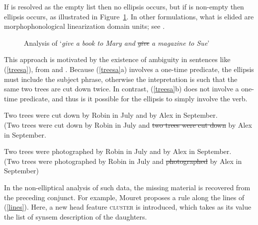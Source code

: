 \documentclass[output=paper]{langsci/langscibook}
\begin{document}
\noindent
If  is resolved as the empty list then no ellipsis occurs, but if  is non-empty then ellipsis occurs, as illustrated in Figure~\ref{lpe}. In other formulations, what is elided are morphophonological
linearization domain units; see \citet{chaveslp}.

\begin{figure}[ht]
    \centering
    

    \caption{Analysis of `\emph{give a book to Mary and} \sout{\emph{give}} \emph{a magazine to Sue}'}\label{lpe}
\end{figure}

\noindent
This approach is motivated by the existence of ambiguity in 
sentences like (\ref{treesa}), from \citet{Beavers} and \citet{chaves06}. Because (\ref{treesa}a) involves a one-time predicate, the ellipsis must include the subject phrase, otherwise
the intepretation is such that the same two trees are cut down twice. In contrast,  (\ref{treesa}b) does not involve a one-time
predicate, and thus is it possible for the ellipsis to simply
involve the verb.


\begin{exe}
\ex 
\begin{xlista}
\ex Two trees were cut down by Robin in July and by Alex in September.\\
(Two trees were cut down by Robin in July and \sout{two trees were cut down} by Alex in September.

\ex Two trees were photographed by Robin in July and by Alex in September.\\
(Two trees were photographed by Robin in July and \sout{photographed} by Alex in September)
\end{xlista}\label{treesa}
\end{exe}



In the non-elliptical analysis of such data, the missing material is recovered from the preceding conjunct. For example, Mouret proposes a rule along the lines of (\ref{lines}).  Here, a new head feature \textsc{cluster} is introduced, which  takes as its value the list of synsem 
description of the  daughters.
\end{document}
